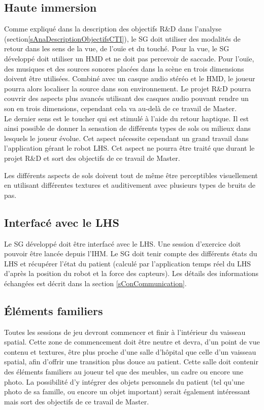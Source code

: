 	\subsection*{Haute immersion}
		Comme expliqué dans la description des objectifs R\&D dans l'analyse (section\ref{sAnaDescriptionObjectifsCTI}), le SG doit utiliser des modalités de retour dans les sens de la vue, de l'ouïe et du touché. Pour la vue, le SG développé doit utiliser un HMD et ne doit pas percevoir de saccade. Pour l'ouïe, des musiques et des sources sonores placées dans la scène en trois dimensions doivent être utilisées. Combiné avec un casque audio stéréo et le HMD, le joueur pourra alors localiser la source dans son environnement. Le projet R\&D pourra couvrir des aspects plus avancés utilisant des casques audio pouvant rendre un son en trois dimensions, cependant cela va au-delà de ce travail de Master.
		\\
		
		Le dernier sens est le toucher qui est stimulé à l'aide du retour haptique. Il est ainsi possible de donner la sensation de différents types de sols ou milieux dans lesquels le joueur évolue. Cet aspect nécessite cependant un grand travail dans l'application gérant le robot LHS. Cet aspect ne pourra être traité que durant le projet R\&D et sort des objectifs de ce travail de Master.
		
		Les différents aspects de sols doivent tout de même être perceptibles visuellement en utilisant différentes textures et auditivement avec plusieurs types de bruits de pas.
		
	\subsection*{Interfacé avec le LHS}
		Le SG développé doit être interfacé avec le LHS. Une session d'exercice doit pouvoir être lancée depuis l'IHM. Le SG doit tenir compte des différents états du LHS et récupérer l'état du patient (calculé par l'application temps réel du LHS d'après la position du robot et la force des capteurs). Les détails des informations échangées est décrit dans la section \ref{sConCommunication}.
	
	\subsection*{Éléments familiers}
		Toutes les sessions de jeu devront commencer et finir à l'intérieur du vaisseau spatial. Cette zone de commencement doit être neutre et devra, d'un point de vue contenu et textures, être plus proche d'une salle d'hôpital que celle d'un vaisseau spatial, afin d'offrir une transition plus douce au patient. Cette salle doit contenir des éléments familiers au joueur tel que des meubles, un cadre ou encore une photo. La possibilité d'y intégrer des objets personnels du patient (tel qu'une photo de sa famille, ou encore un objet important) serait également intéressant mais sort des objectifs de ce travail de Master.
	

